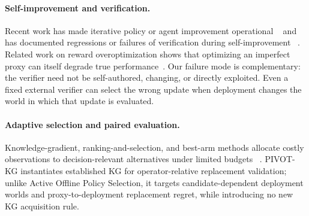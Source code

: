 \documentclass{article}
\begin{document}
\paragraph{Self-improvement and verification.}
Recent work has made iterative policy or agent improvement operational
~\citep{evopolicygym2026,dgm2025} and has documented regressions or failures of
verification during self-improvement
~\citep{wu2024progress,selfauthored2026}. Related work on reward
overoptimization shows that optimizing an imperfect proxy can itself degrade
true performance~\citep{gao2023reward,laidlaw2025correlated}.
Our failure mode is complementary: the verifier need not be self-authored,
changing, or directly exploited. Even a fixed external verifier can select the
wrong update when deployment changes the world in which that update is
evaluated.

\paragraph{Adaptive selection and paired evaluation.}
Knowledge-gradient, ranking-and-selection, and best-arm methods allocate costly
observations to decision-relevant alternatives under limited budgets
~\citep{chick2001crn,frazier2009kg,kalyanakrishnan2012pac,xie2016pairwise,konyushova2021active}.
PIVOT-KG instantiates established KG for operator-relative replacement
validation; unlike Active Offline Policy Selection, it targets candidate-dependent
deployment worlds and proxy-to-deployment replacement regret, while
introducing no new KG acquisition rule.
\end{document}
